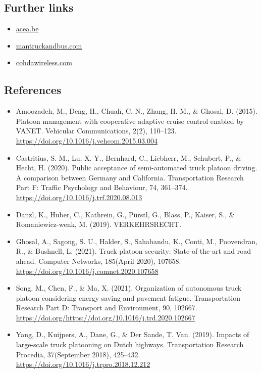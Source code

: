 \documentclass[
]{book}
\providecommand{\tightlist}{%
  \setlength{\itemsep}{0pt}\setlength{\parskip}{0pt}}
\begin{document}
\hypertarget{further-links-6}{%
\subsection*{Further links}\label{further-links-6}}

\begin{itemize}
\tightlist
\item
  \href{https://www.acea.be/uploads/publications/Platooning_roadmap.pdf}{acea.be}
\item
  \href{https://www.mantruckandbus.com/en/innovation/why-platooning-is-the-future-of-delivery-traffic.html}{mantruckandbus.com}
\item
  \href{https://cohdawireless.com/platooning/}{cohdawireless.com}
\end{itemize}

\hypertarget{references-7}{%
\subsection*{References}\label{references-7}}

\begin{itemize}
\tightlist
\item
  Amoozadeh, M., Deng, H., Chuah, C. N., Zhang, H. M., \& Ghosal, D. (2015). Platoon management with cooperative adaptive cruise control enabled by VANET. Vehicular Communications, 2(2), 110--123. \url{https://doi.org/10.1016/j.vehcom.2015.03.004}
\item
  Castritius, S. M., Lu, X. Y., Bernhard, C., Liebherr, M., Schubert, P., \& Hecht, H. (2020). Public acceptance of semi-automated truck platoon driving. A comparison between Germany and California. Transportation Research Part F: Traffic Psychology and Behaviour, 74, 361--374. \url{https://doi.org/10.1016/j.trf.2020.08.013}
\item
  Danzl, K., Huber, C., Kathrein, G., Pürstl, G., Blass, P., Kaiser, S., \& Romaniewicz-wenk, M. (2019). VERKEHRSRECHT.
\item
  Ghosal, A., Sagong, S. U., Halder, S., Sahabandu, K., Conti, M., Poovendran, R., \& Bushnell, L. (2021). Truck platoon security: State-of-the-art and road ahead. Computer Networks, 185(April 2020), 107658. \url{https://doi.org/10.1016/j.comnet.2020.107658}
\item
  Song, M., Chen, F., \& Ma, X. (2021). Organization of autonomous truck platoon considering energy saving and pavement fatigue. Transportation Research Part D: Transport and Environment, 90, 102667. \url{https://doi.org/https://doi.org/10.1016/j.trd.2020.102667}
\item
  Yang, D., Kuijpers, A., Dane, G., \& Der Sande, T. Van. (2019). Impacts of large-scale truck platooning on Dutch highways. Transportation Research Procedia, 37(September 2018), 425--432. \url{https://doi.org/10.1016/j.trpro.2018.12.212}
\end{itemize}
\end{document}

